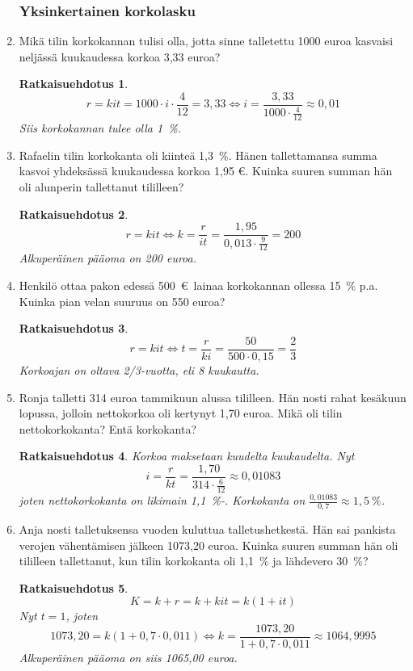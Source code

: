 \documentclass[a4paper,10pt,twoside]{article}
\newtheorem*{ratkaisu}{Ratkaisuehdotus}
\begin{document}
\begin{enumerate}
\subsubsection*{Yksinkertainen korkolasku}

\item Mikä tilin korkokannan tulisi olla, jotta sinne talletettu 1000 euroa kasvaisi neljässä kuukaudessa korkoa 3,33 euroa?
\begin{ratkaisu}
    \[
    r = kit = 1000\cdot i\cdot \frac{4}{12} = 3,33\Leftrightarrow i = \frac{3,33}{1000\cdot\frac{4}{12}}\approx 0,01
    \]
    Siis korkokannan tulee olla 1~\%.
\end{ratkaisu}

\item Rafaelin tilin korkokanta oli kiinteä 1,3~\%. Hänen tallettamansa summa kasvoi yhdeksässä kuukaudessa korkoa 1,95 \euro.
Kuinka suuren summan hän oli alunperin tallettanut tililleen?
\begin{ratkaisu}
    \[
    r = kit \Leftrightarrow k = \frac{r}{it} = \frac{1,95}{0,013\cdot\frac{9}{12}} = 200
    \]
    Alkuperäinen pääoma on 200 euroa.
\end{ratkaisu}

\item Henkilö ottaa pakon edessä 500~\euro\ lainaa korkokannan ollessa 15~\% p.a. Kuinka pian velan suuruus on 550 euroa?
\begin{ratkaisu}
    \[
        r = kit \Leftrightarrow t = \frac{r}{ki} = \frac{50}{500\cdot0,15} = \frac{2}{3}
    \]
    Korkoajan on oltava 2/3-vuotta, eli 8 kuukautta.
\end{ratkaisu}

\item Ronja talletti 314 euroa tammikuun alussa tililleen. Hän nosti rahat kesäkuun lopussa, jolloin nettokorkoa oli kertynyt
 1,70 euroa. Mikä oli tilin nettokorkokanta? Entä korkokanta?
\begin{ratkaisu}
    Korkoa maksetaan kuudelta kuukaudelta. Nyt
    \[
        i = \frac{r}{kt} = \frac{1,70}{314\cdot\frac{6}{12}}\approx 0,01083
    \]
    joten nettokorkokanta  on likimain 1,1~\%-. Korkokanta on \(\frac{0,01083}{0,7}\approx 1,5~\%\).
\end{ratkaisu}

\item Anja nosti talletuksensa vuoden kuluttua talletushetkestä. Hän sai pankista verojen vähentämisen jälkeen 1073,20 euroa.
 Kuinka suuren summan hän oli tililleen tallettanut, kun tilin korkokanta oli 1,1~\% ja lähdevero 30~\%?
\begin{ratkaisu}
    \[
        K = k + r = k + kit = k(1+it)
    \]
    Nyt \(t = 1\), joten
    \[
        1073,20 = k(1+0,7\cdot0,011)\Leftrightarrow k = \frac{1073,20}{1+0,7\cdot0,011} \approx 1064,9995
    \]
    Alkuperäinen pääoma on siis 1065,00 euroa.
    \end{ratkaisu}


\end{enumerate}
\end{document}
